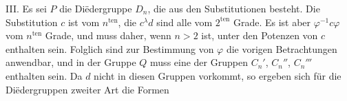 III. Es sei $P$ die Di\"edergruppe $D_n$, die aus den Substitutionen
besteht. Die Substitution $c$ ist vom $n^{\text{ten}}$, die $c^\lambda d$ sind alle vom $2^{\text{ten}}$ Grade. Es ist aber $\varphi^{-1}c\varphi$ vom $n^{\text{ten}}$ Grade, und muss daher, wenn $n > 2$ ist, unter den Potenzen von $c$ enthalten sein. Folglich sind zur Bestimmung von $\varphi$ die vorigen Betrachtungen anwendbar, und in der Gruppe $Q$ muss eine der Gruppen $C_n'$, $C_n''$, $C_n'''$ enthalten sein. Da $d$ nicht in diesen Gruppen vorkommt, so ergeben sich f\"ur die Di\"edergruppen zweiter Art die Formen
